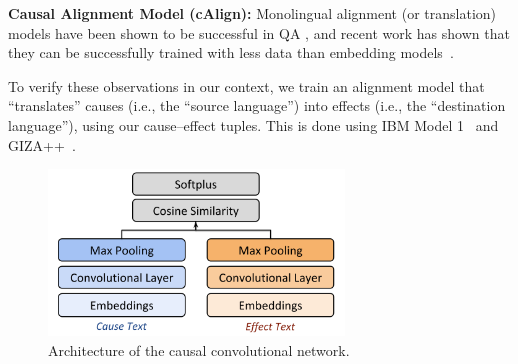 {\flushleft \textbf{Causal Alignment Model (cAlign):}}
Monolingual alignment (or translation) models have been shown to be successful in QA \cite{Berger:00,Echihabi:03,Soricut:06,Riezler:etal:2007,Surdeanu:11,yao2013}, and recent work has shown that they can be successfully trained with less data than embedding models~\cite{sharp2015spinning}. 

To verify these observations in our context, we train an alignment model that ``translates'' causes (i.e., the ``source language'') into effects (i.e., the ``destination language''), using our cause--effect tuples. 
This is done using IBM Model 1~\cite{Brown:93} and GIZA++~\cite{och03}. 


\begin{figure}[t!]
\begin{center}
\includegraphics[width=0.7\textwidth]{mainmatter/emnlp2016-causal/cnn2.png}
\caption{{\footnotesize Architecture of the causal convolutional network. }}
\label{fig:cnn}
\end{center}
\end{figure}

